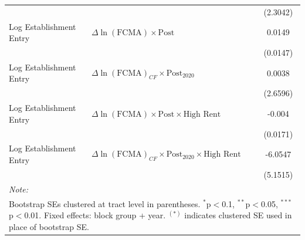\begin{table}[!h]
{\begin{tabular}[t]{llc}
 &  & (2.3042)\\
Log Establishment Entry & $\Delta\ln(\text{FCMA}) \times \text{Post}$ & 0.0149\\
\addlinespace
 &  & (0.0147)\\
Log Establishment Entry & $\Delta\ln(\text{FCMA})_{CF} \times \text{Post}_{2020}$ & 0.0038\\
 &  & (2.6596)\\
Log Establishment Entry & $\Delta\ln(\text{FCMA}) \times \text{Post} \times \text{High Rent}$ & -0.004\\
 &  & (0.0171)\\
\addlinespace
Log Establishment Entry & $\Delta\ln(\text{FCMA})_{CF} \times \text{Post}_{2020} \times \text{High Rent}$ & -6.0547\\
 &  & (5.1515)\\
\bottomrule
\multicolumn{3}{l}{\rule{0pt}{1em}\textit{Note: }}\\
\multicolumn{3}{l}{\rule{0pt}{1em}Bootstrap SEs clustered at tract level in parentheses. $^{*}$p$<$0.1, $^{**}$p$<$0.05, $^{***}$p$<$0.01. Fixed effects: block group + year. $^{(*)}$ indicates clustered SE used in place of bootstrap SE.}\\
\end{tabular}}
\end{table}

